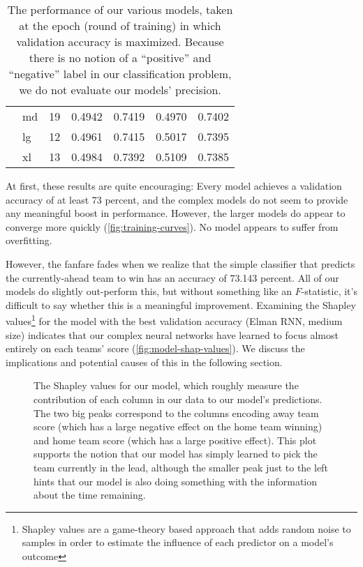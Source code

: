 \begin{table}
\begin{tabular}{r l  ccccc}
		         & md   & 19    & 0.4942                                   & 0.7419                                     & 0.4970 & 0.7402   \\
		         & lg   & 12    & 0.4961                                   & 0.7415                                     & 0.5017 & 0.7395   \\
		         & xl   & 13    & 0.4984                                   & 0.7392                                     & 0.5109 & 0.7385   \\
		\hline
	\end{tabular}
	\caption{The performance of our various models, taken at the epoch (round of training) in which validation accuracy is maximized. Because there is no notion of a ``positive'' and ``negative'' label in our classification problem, we do not evaluate our models' precision.}
	\label{tbl:model-results}
\end{table}

At first, these results are quite encouraging: Every model achieves a validation accuracy of at least 73 percent, and the complex models do not seem to provide any meaningful boost in performance. However, the larger models do appear to converge more quickly (\autoref{fig:training-curves}). No model appears to suffer from overfitting.

However, the fanfare fades when we realize that the simple classifier that predicts the currently-ahead team to win has an accuracy of 73.143 percent. All of our models do slightly out-perform this, but without something like an $F$-statistic, it's difficult to say whether this is a meaningful improvement.
Examining the Shapley values\footnote{Shapley values are a game-theory based approach that adds random noise to samples in order to estimate the influence of each predictor on a model's outcome} \cite{captum, shap-paper} for the model with the best validation accuracy (Elman RNN, medium size) indicates that our complex neural networks have learned to focus almost entirely on each teams' score (\autoref{fig:model-shap-values}).
We discuss the implications and potential causes of this in the following section.

\begin{figure}
	\centering
	
	\caption{The Shapley values for our model, which roughly measure the contribution of each column in our data to our model's predictions. The two big peaks correspond to the columns encoding away team score (which has a large negative effect on the home team winning) and home team score (which has a large positive effect). This plot supports the notion that our model has simply learned to pick the team currently in the lead, although the smaller peak just to the left hints that our model is also doing something with the information about the time remaining.}
	\label{fig:model-shap-values}
\end{figure}

